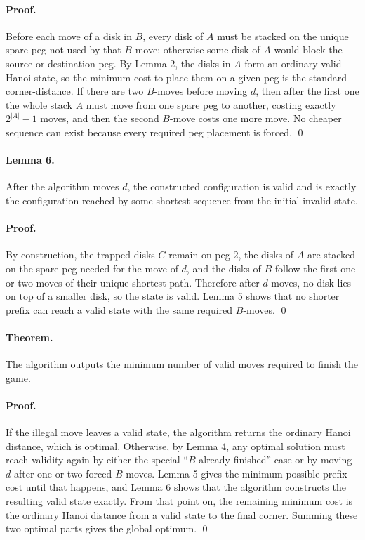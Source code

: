 \documentclass[11pt]{article}
\begin{document}
\paragraph{Proof.}
Before each move of a disk in $B$, every disk of $A$ must be stacked on the unique spare peg not used by that $B$-move; otherwise some disk of $A$ would block the source or destination peg. By Lemma 2, the disks in $A$ form an ordinary valid Hanoi state, so the minimum cost to place them on a given peg is the standard corner-distance. If there are two $B$-moves before moving $d$, then after the first one the whole stack $A$ must move from one spare peg to another, costing exactly $2^{|A|}-1$ moves, and then the second $B$-move costs one more move. No cheaper sequence can exist because every required peg placement is forced. \qed

\paragraph{Lemma 6.}
After the algorithm moves $d$, the constructed configuration is valid and is exactly the configuration reached by some shortest sequence from the initial invalid state.

\paragraph{Proof.}
By construction, the trapped disks $C$ remain on peg $2$, the disks of $A$ are stacked on the spare peg needed for the move of $d$, and the disks of $B$ follow the first one or two moves of their unique shortest path. Therefore after $d$ moves, no disk lies on top of a smaller disk, so the state is valid. Lemma 5 shows that no shorter prefix can reach a valid state with the same required $B$-moves. \qed

\paragraph{Theorem.}
The algorithm outputs the minimum number of valid moves required to finish the game.

\paragraph{Proof.}
If the illegal move leaves a valid state, the algorithm returns the ordinary Hanoi distance, which is optimal. Otherwise, by Lemma 4, any optimal solution must reach validity again by either the special ``$B$ already finished'' case or by moving $d$ after one or two forced $B$-moves. Lemma 5 gives the minimum possible prefix cost until that happens, and Lemma 6 shows that the algorithm constructs the resulting valid state exactly. From that point on, the remaining minimum cost is the ordinary Hanoi distance from a valid state to the final corner. Summing these two optimal parts gives the global optimum. \qed
\end{document}
